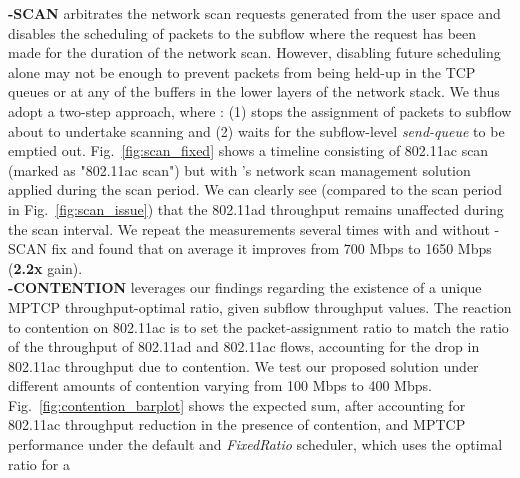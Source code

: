 \begin{figure*}[t]
    \centering
    \hfill
    \hfill
    \vspace{-0.15in}
    \caption{\name}
    \vspace{-0.1in}
\end{figure*}
\fi
\noindent\textbf{\name-SCAN} arbitrates the network scan requests generated
from the user space and disables the scheduling of packets to the
subflow where the request has been made for the duration of the
network scan. However, disabling future scheduling alone may not be
enough to prevent packets from being held-up in the TCP queues or at
any of the buffers in the lower layers of the network stack. We thus
adopt a two-step approach, where \name: (1) stops the assignment of
packets to subflow about to undertake scanning and (2) waits for the
subflow-level \emph{send-queue} to be emptied out. Fig.~\ref{fig:scan_fixed} shows 
a timeline consisting of 802.11ac scan (marked as "802.11ac scan") but with \name's 
network scan management solution applied during the scan period. We can clearly see (compared
to the scan period in Fig.~\ref{fig:scan_issue}) that the 802.11ad
throughput remains unaffected during the scan interval. We repeat the
measurements several times with and without \name-SCAN fix and found 
that on average it improves from 700 Mbps to 1650 Mbps (\textbf{2.2x} gain).
\\
\noindent\textbf{\name-CONTENTION} leverages our findings regarding the 
existence of a unique MPTCP throughput-optimal ratio, given subflow throughput values. The 
reaction to contention on 802.11ac is to set the packet-assignment ratio to match the ratio of
the throughput of 802.11ad and 802.11ac flows, accounting for the drop
in 802.11ac throughput due to contention. We test our proposed
solution under different amounts of contention varying from 100 Mbps
to 400 Mbps. Fig.~\ref{fig:contention_barplot} shows the expected sum,
after accounting for 802.11ac throughput reduction in the presence of
contention, and MPTCP performance under the default
and \emph{FixedRatio} scheduler, which uses the optimal ratio for a
